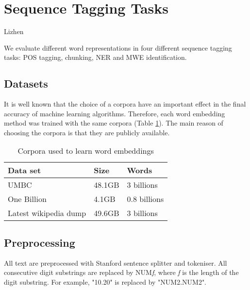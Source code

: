 \section{Sequence Tagging Tasks}
\label{sec:SeqTagging}

{\color{red}Lizhen}

We evaluate different word representations in four different sequence tagging tasks: POS tagging, chunking, NER and MWE identification. 


\subsection{Datasets}
It is well known that the choice of a corpora have an important effect in the final accuracy of machine learning algorithms. 
Therefore, each word embedding method was trained with the same corpora (Table \ref{wordEmbedCorpora}). The main reason of choosing the corpora 
is that they are publicly available. 

\begin{table}[h]
\begin{center}
\begin{small}
\begin{tabular}{lll}
\hline
\textbf{Data set} & \textbf{Size} & \textbf{Words} \\ \hline
UMBC 	& 48.1GB & 3 billions \\
One Billion 	& 4.1GB & 0.8 billions  \\
Latest wikipedia dump & 49.6GB & 3 billions \\ \hline
\end{tabular}
\end{small}
\caption{Corpora used to learn word embeddings}
\label{wordEmbedCorpora}
\end{center}
\end{table}

\subsection{Preprocessing}
All text are preprocessed with Stanford sentence splitter and tokeniser. All consecutive digit substrings are replaced by NUM\textit{f}, where \textit{f} is the length of the digit substring. For example, "10.20" is replaced by "NUM2.NUM2".



